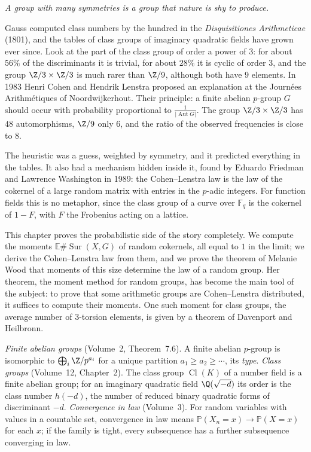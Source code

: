 \begin{center}\itshape
A group with many symmetries is a group that nature is shy to produce.
\end{center}

Gauss computed class numbers by the hundred in the \emph{Disquisitiones Arithmeticae} (1801), and the tables of class groups of imaginary quadratic fields have grown ever since. Look at the part of the class group of order a power of $3$: for about $56\%$ of the discriminants it is trivial, for about $28\%$ it is cyclic of order $3$, and the group $\Z/3\times\Z/3$ is much rarer than $\Z/9$, although both have $9$ elements. In 1983 Henri Cohen and Hendrik Lenstra proposed an explanation at the Journées Arithmétiques of Noordwijkerhout. Their principle: a finite abelian $p$-group $G$ should occur with probability proportional to $\frac1{|\operatorname{Aut}G|}$. The group $\Z/3\times\Z/3$ has $48$ automorphisms, $\Z/9$ only $6$, and the ratio of the observed frequencies is close to $8$.

The heuristic was a guess, weighted by symmetry, and it predicted everything in the tables. It also had a mechanism hidden inside it, found by Eduardo Friedman and Lawrence Washington in 1989: the Cohen--Lenstra law is the law of the cokernel of a large random matrix with entries in the $p$-adic integers. For function fields this is no metaphor, since the class group of a curve over $\mathbb F_q$ is the cokernel of $1-F$, with $F$ the Frobenius acting on a lattice.

This chapter proves the probabilistic side of the story completely. We compute the moments $\mathbb E\#\operatorname{Sur}(X,G)$ of random cokernels, all equal to $1$ in the limit; we derive the Cohen--Lenstra law from them, and we prove the theorem of Melanie Wood that moments of this size determine the law of a random group. Her theorem, the moment method for random groups, has become the main tool of the subject: to prove that some arithmetic groups are Cohen--Lenstra distributed, it suffices to compute their moments. One such moment for class groups, the average number of $3$-torsion elements, is given by a theorem of Davenport and Heilbronn.

\begin{reminder}
\emph{Finite abelian groups} (Volume~2, Theorem~7.6). A finite abelian $p$-group is isomorphic to $\bigoplus_i\Z/p^{a_i}$ for a unique partition $a_1\ge a_2\ge\cdots$, its \emph{type}.
\emph{Class groups} (Volume~12, Chapter~2). The class group $\operatorname{Cl}(K)$ of a number field is a finite abelian group; for an imaginary quadratic field $\Q(\sqrt{-d})$ its order is the class number $h(-d)$, the number of reduced binary quadratic forms of discriminant $-d$.
\emph{Convergence in law} (Volume~3). For random variables with values in a countable set, convergence in law means $\mathbb P(X_n=x)\to\mathbb P(X=x)$ for each $x$; if the family is tight, every subsequence has a further subsequence converging in law.
\end{reminder}


